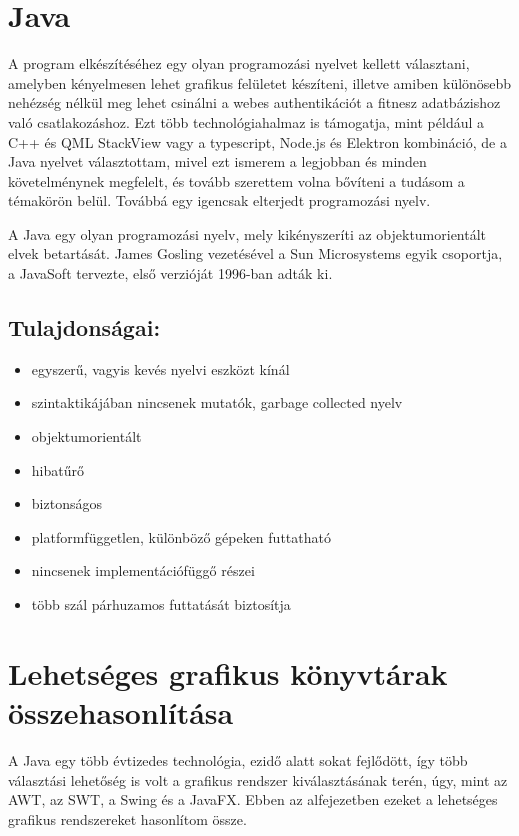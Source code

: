 \section{Java}

A program elkészítéséhez egy olyan programozási nyelvet kellett választani, amelyben kényelmesen lehet grafikus felületet készíteni, illetve amiben különösebb nehézség nélkül meg lehet csinálni a webes authentikációt a fitnesz adatbázishoz való csatlakozáshoz.
Ezt több technológiahalmaz is támogatja, mint például a C++ és QML StackView vagy a typescript, Node.js és Elektron kombináció, de a Java nyelvet választottam, mivel ezt ismerem a legjobban és minden követelménynek megfelelt, és tovább szerettem volna bővíteni a tudásom a témakörön belül.
Továbbá egy igencsak elterjedt programozási nyelv.

A Java  egy olyan programozási nyelv, mely kikényszeríti az objektumorientált elvek betartását.
James Gosling vezetésével a Sun Microsystems egyik csoportja, a JavaSoft tervezte, első verzióját 1996-ban adták ki.


\subsection*{Tulajdonságai:}
\begin{itemize}
\item egyszerű, vagyis kevés nyelvi eszközt kínál
\item szintaktikájában nincsenek mutatók, garbage collected nyelv
\item objektumorientált
\item hibatűrő
\item biztonságos
\item platformfüggetlen, különböző gépeken futtatható
\item nincsenek implementációfüggő részei
\item több szál párhuzamos futtatását biztosítja
\end{itemize}

\section{Lehetséges grafikus könyvtárak összehasonlítása}

A Java egy több évtizedes technológia, ezidő alatt sokat fejlődött, így több választási lehetőség is volt a grafikus rendszer kiválasztásának terén, úgy, mint az AWT, az SWT, a Swing és a JavaFX.
Ebben az alfejezetben ezeket a lehetséges grafikus rendszereket hasonlítom össze. 

